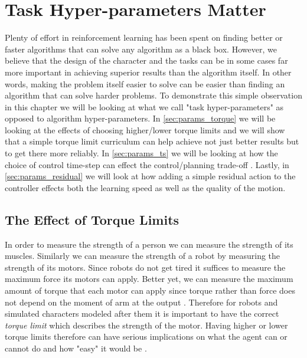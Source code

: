 \chapter{Task Hyper-parameters Matter}
\label{ch:envparams}

Plenty of effort in reinforcement learning has been spent on finding better or faster algorithms that can solve any algorithm as a black box. However, we  believe that the design of the character and the tasks can be in some cases far more important in achieving superior results  than the algorithm itself. In other words, making the problem itself easier to solve can be easier than finding an algorithm that can solve harder problems. To demonstrate this simple observation in this chapter we will be looking at what we call "task hyper-parameters" as opposed to algorithm hyper-parameters. In \autoref{sec:params_torque} we will be looking at the effects of choosing higher/lower torque limits and we will show that a simple torque limit curriculum can help achieve not just better results but to get there more reliably. In \autoref{sec:params_ts} we will be looking at how the choice of control time-step can effect the control/planning trade-off . Lastly, in \autoref{sec:params_residual} we will look at how adding a simple residual action to the controller effects both the learning speed as well as the quality of the motion.


\section{The Effect of Torque Limits}
\label{sec:params_torque}

In order to measure the strength of a person we can measure the strength of its muscles. Similarly we can measure the strength of a robot by measuring the strength of its motors. Since robots do not get tired it suffices to measure the maximum force its motors can apply. Better yet, we can measure the maximum amount of torque that each motor can apply since torque rather than force does not depend on the moment of arm at the output . Therefore for robots and simulated characters modeled after them it is important to have the correct \textit{torque limit} which describes the strength of the motor. Having higher or lower torque limits therefore can have serious implications on what the agent can or cannot do and how "easy" it would be .



